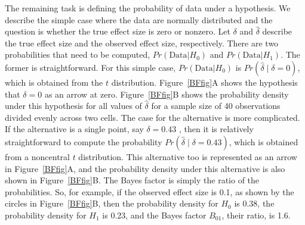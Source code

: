 \documentclass[man]{apa6}
\begin{document}
The remaining task is defining the probability of data under a hypothesis.  We describe the simple case where the data are normally distributed and the question is whether the true effect size is zero or nonzero.  Let $\delta$ and $\hat{\delta}$ describe the true effect size and the observed effect size, respectively.  There are two probabilities that need to be computed,   $Pr(\mbox{Data} | H_0)$ and $Pr(\mbox{Data} | H_1)$.   The former is straightforward.  For this simple case, $Pr(\mbox{Data} | H_0)$ is $Pr(\hat{\delta} \mid \delta=0)$, which is obtained from the $t$ distribution.  Figure~\ref{BFfig}A shows the hypothesis that $\delta=0$ as an arrow at zero.  Figure~\ref{BFfig}B shows the probability density under this hypothesis for all values of $\hat{\delta}$ for a sample size of 40 observations divided evenly across two cells. The case for the alternative is more complicated.  If the alternative is a single point, say $\delta=0.43$ \citep[here chosen as an example because $\delta = 0.43$ is the effect size of violent games on aggressive behaviors as described by][]{Anderson:etal:2010}, then it is relatively straightforward to compute the probability $Pr(\hat{\delta} \mid \delta=0.43)$, which is obtained from a noncentral $t$ distribution.   This alternative too is represented as an arrow in Figure~\ref{BFfig}A, and the probability density under this alternative is also shown in Figure~\ref{BFfig}B. The Bayes factor is simply the ratio of the probabilities.  So, for example, if the observed effect size is 0.1, as shown by the circles in Figure~\ref{BFfig}B, then the probability density for $H_0$ is 0.38, the probability density for $H_1$ is 0.23, and the Bayes factor $B_{01}$, their ratio, is 1.6. 
\end{document}
